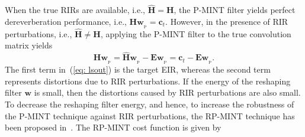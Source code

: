\documentclass{aes60i}
\begin{document}
When the true RIRs are available, i.e., $\hat{\mathbf{H}} = \mathbf{H}$, the P-MINT filter yields perfect dereverberation performance, i.e., $\mathbf{H}\mathbf{w}_{_{\text{P}}} = \mathbf{c}_t$.
However, in the presence of RIR perturbations, i.e., $\hat{\mathbf{H}} \neq \mathbf{H}$, applying the P-MINT filter to the true convolution matrix yields
\begin{equation}
\label{eq: lsout}
\mathbf{H}\mathbf{w}_{_{\text{P}}} = \hat{\mathbf{H}} \mathbf{w}_{_{\text{P}}} - \mathbf{E}\mathbf{w}_{_{\text{P}}} = \mathbf{c}_t - \mathbf{E}\mathbf{w}_{_{\text{P}}}.
\end{equation}
The first term in~(\ref{eq: lsout}) is the target EIR, whereas the second term represents distortions due to RIR perturbations.
If the energy of the reshaping filter $\mathbf{w}$ is small, then the distortions caused by RIR perturbations are also small.
To decrease the reshaping filter energy, and hence, to increase the robustness of the P-MINT technique against RIR perturbations, the RP-MINT technique has been proposed in~\cite{Hikichi_EURASIP_2007,Kodrasi_ITASLP_2013}.
The RP-MINT cost function is given by
\end{document}
